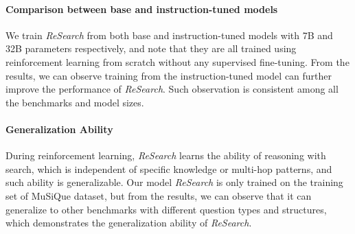 \documentclass{article}
\begin{document}
\paragraph{Comparison between base and instruction-tuned models}
We train \textit{ReSearch} from both base and instruction-tuned models with 7B and 32B parameters respectively, and note that they are all trained using reinforcement learning from scratch without any supervised fine-tuning. 
From the results, we can observe training from the instruction-tuned model can further improve the performance of \textit{ReSearch}. Such observation is consistent among all the benchmarks and model sizes.

\paragraph{Generalization Ability}
During reinforcement learning, \textit{ReSearch} learns the ability of reasoning with search, which is independent of specific knowledge or multi-hop patterns, and such ability is generalizable.
Our model \textit{ReSearch} is only trained on the training set of MuSiQue dataset, but from the results, we can observe that it can generalize to other benchmarks with different question types and structures, which demonstrates the generalization ability of \textit{ReSearch}.
\end{document}
